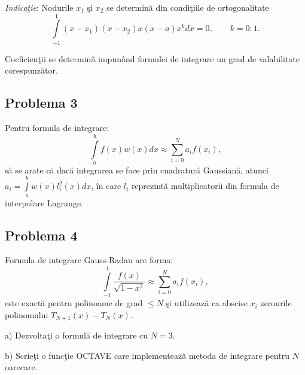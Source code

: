 \documentclass{exam}
\begin{document}
\textit{Indica\c{t}ie}: Nodurile $x_1$ şi $x_2$ se determin\u{a} din condi\c{t}iile de ortogonalitate
$$ \int\limits_{-1}^1(x-x_1)(x-x_2)x(x-a)x^kdx=0, \qquad k=0:1. $$

Coeficien\c{t}ii se determin\u{a} impun\^{a}nd formulei de integrare un grad de valabilitate corespunz\u{a}tor.

\subsection{Problema 3}
Pentru formula de integrare:
$$\int\limits_a^bf(x)w(x)dx\approx\sum\limits_{i=0}^{N}a_if(x_i),$$
\noindent  să se arate că dacă integrarea se face prin cuadratură Gaussiană, atunci $a_i=\int\limits_a^bw(x)l^2_i(x)dx$, \^{i}n care $l_i$ reprezint\u{a} multiplicatorii din formula de interpolare Lagrange.

\subsection{Problema 4}
Formula de integrare Gauss-Radau are forma:
$$\int\limits_{-1}^1\frac{f(x)}{\sqrt{1-x^2}}\approx\sum\limits_{i=0}^{N}a_if(x_i),$$
este exact\u{a} pentru polinoame de grad $\leq N$ \c{s}i utilizeaz\u{a} ca abscise $x_i$ zerourile polinomului $T_{N+1}(x)-T_N(x)$.

a) Dezvolta\c{t}i o formul\u{a} de integrare cu $N=3$.

b) Scrie\c{t}i o func\c{t}ie OCTAVE care implementeaz\u{a} metoda de integrare pentru $N$ oarecare.
\end{document}
